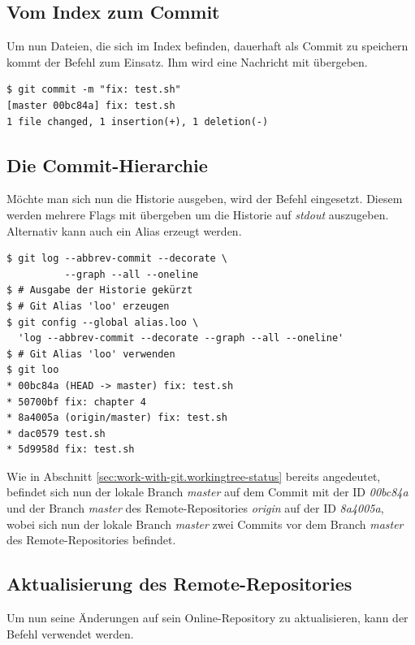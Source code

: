 \subsection{Vom Index zum Commit}
\label{sec:work-with-git.index-to-commit}
Um nun Dateien, die sich im Index befinden, dauerhaft als Commit zu speichern kommt der Befehl \textit{} zum Einsatz. Ihm wird eine Nachricht mit übergeben.

\begin{verbatim}
$ git commit -m "fix: test.sh"
[master 00bc84a] fix: test.sh
1 file changed, 1 insertion(+), 1 deletion(-)
\end{verbatim}

\subsection{Die Commit-Hierarchie}
\label{sec:work-with-git.log-hierarchie}
Möchte man sich nun die Historie ausgeben, wird der Befehl  \textit{} eingesetzt. Diesem werden mehrere Flags mit übergeben um die Historie auf \textit{stdout} auszugeben. Alternativ kann auch ein Alias erzeugt werden.

\begin{verbatim}
$ git log --abbrev-commit --decorate \
          --graph --all --oneline
$ # Ausgabe der Historie gekürzt
$ # Git Alias 'loo' erzeugen
$ git config --global alias.loo \
  'log --abbrev-commit --decorate --graph --all --oneline'
$ # Git Alias 'loo' verwenden
$ git loo
* 00bc84a (HEAD -> master) fix: test.sh
* 50700bf fix: chapter 4
* 8a4005a (origin/master) fix: test.sh
* dac0579 test.sh
* 5d9958d fix: test.sh
\end{verbatim}

Wie in Abschnitt \ref{sec:work-with-git.workingtree-status} bereits angedeutet, befindet sich nun der lokale Branch \textit{master} auf dem Commit mit der ID \textit{00bc84a} und der Branch \textit{master} des Remote-Repositories \textit{origin} auf der ID \textit{8a4005a}, wobei sich nun der lokale Branch \textit{master} zwei Commits vor dem Branch \textit{master} des Remote-Repositories befindet.

\subsection{Aktualisierung des Remote-Repositories}
\label{sec:work-with-git.update-online-repo}
Um nun seine Änderungen auf sein Online-Repository zu aktualisieren, kann der Befehl \textit{} verwendet werden.

